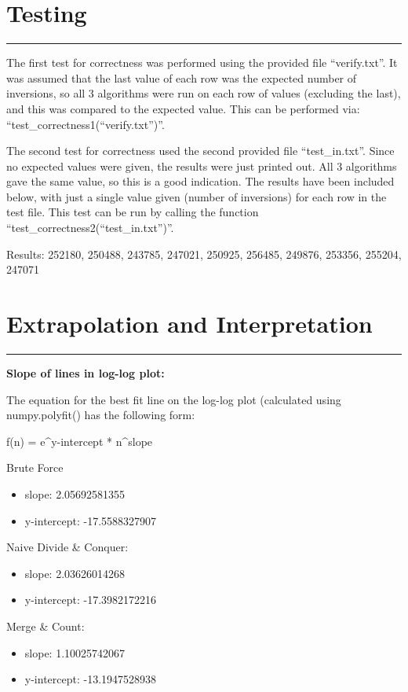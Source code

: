 \documentclass[letterpaper,10pt,titlepage,fleqn]{article}
\begin{document}
\section*{Testing}
\hrule
The first test for correctness was performed using the provided file ``verify.txt''. It was assumed that the last value of each row was the expected number of inversions, so all 3 algorithms were run on each row of values (excluding the last), and this was compared to the expected value. This can be performed via: ``test\_correctness1(``verify.txt'')''.

The second test for correctness used the second provided file ``test\_in.txt''. Since no expected values were given, the results were just printed out. All 3 algorithms gave the same value, so this is a good indication. The results have been included below, with just a single value given (number of inversions) for each row in the test file. This test can be run by calling the function ``test\_correctness2(``test\_in.txt'')''.

Results:
252180, 250488, 243785, 247021, 250925, 256485, 249876, 253356, 255204, 247071

\section*{Extrapolation and Interpretation}
\hrule

\begin{centering}
\textbf{Slope of lines in log-log plot:}
\end{centering}

The equation for the best fit line on the log-log plot (calculated using numpy.polyfit() has the following form:

f(n) = e^y-intercept * n^slope

Brute Force
\begin{itemize}
\item slope: 2.05692581355
\item y-intercept: -17.5588327907
\end{itemize}

Naive Divide \& Conquer:
\begin{itemize}
\item slope: 2.03626014268
\item y-intercept: -17.3982172216
\end{itemize}

Merge \& Count:
\begin{itemize}
\item slope: 1.10025742067
\item y-intercept: -13.1947528938
\end{itemize}
\end{document}
